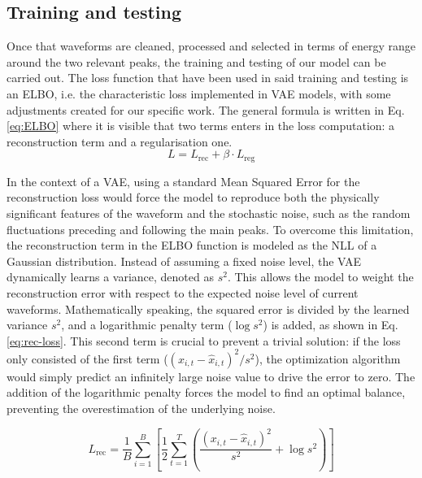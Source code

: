 \subsection{Training and testing}
\label{subsec:VAE-training}
Once that waveforms are cleaned, processed and selected in terms of energy range around the two relevant peaks, the training and testing of our model can be carried out. 
The loss function that have been used in said training and testing is an \ac{ELBO}, i.e. the characteristic loss implemented in \ac{VAE} models, with some adjustments created for our specific work. The general formula is written in Eq. \ref{eq:ELBO} where it is visible that two terms enters in the loss computation: a reconstruction term and a regularisation one.
\begin{equation}
    \label{eq:ELBO}
    L = L_{\text{rec}} + \beta \cdot L_{\text{reg}}
\end{equation}

In the context of a \ac{VAE}, using a standard Mean Squared Error for the reconstruction loss would force the model to reproduce both the physically significant features of the waveform and the stochastic noise, such as the random fluctuations preceding and following the main peaks. To overcome this limitation, the reconstruction term in the \ac{ELBO} function is modeled as the \ac{NLL} of a Gaussian distribution. Instead of assuming a fixed noise level, the \ac{VAE} dynamically learns a variance, denoted as $s^2$. This allows the model to weight the reconstruction error with respect to the expected noise level of current waveforms.
Mathematically speaking, the squared error is divided by the learned variance $s^2$, and a logarithmic penalty term ($\log s^2$) is added, as shown in Eq. \ref{eq:rec-loss}. This second term is crucial to prevent a trivial solution: if the loss only consisted of the first term ($( x_{i,t} - \hat{x}_{i,t} )^2 / s^2$), the optimization algorithm would simply predict an infinitely large noise value to drive the error to zero. The addition of the logarithmic penalty forces the model to find an optimal balance, preventing the overestimation of the underlying noise. 

\begin{equation}
    \label{eq:rec-loss}
    L_{\text{rec}} = \frac{1}{B} \sum_{i=1}^{B} \left[ \frac{1}{2} \sum_{t=1}^{T} \left( \frac{\left( x_{i,t} - \hat{x}_{i,t} \right)^2}{s^2} + \log s^2 \right) \right]
\end{equation}

